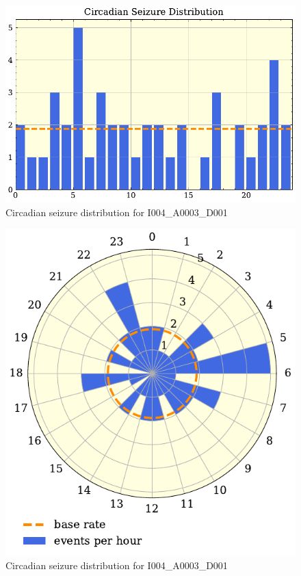 

\begin{figure}[htbp]
    \centering
    \includegraphics{5Results/figs/prior/hist.pdf}
    \caption{Circadian seizure distribution for I004\_A0003\_D001
    }
    \label{fig:events_circadian_hist}
\end{figure}


\begin{figure}[htbp]
    \centering
    \includegraphics{5Results/figs/prior/polar_hist.pdf}
    \caption{Circadian seizure distribution for I004\_A0003\_D001}
    \label{fig:events_circadian_polar_hist}
\end{figure}



\protect {}
